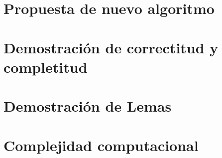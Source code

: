 \section{Propuesta de nuevo algoritmo}



\FloatBarrier

\section{Demostración de correctitud y completitud}


\section{Demostración de Lemas}


\section{Complejidad computacional}



